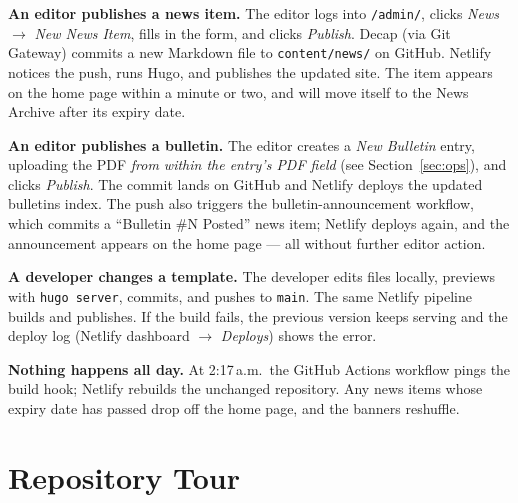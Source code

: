 \documentclass[12pt,letterpaper]{article}
\begin{document}
\textbf{An editor publishes a news item.} The editor logs into
\texttt{/admin/}, clicks \emph{News} $\rightarrow$ \emph{New News Item},
fills in the form, and clicks \emph{Publish}. Decap (via Git Gateway)
commits a new Markdown file to \texttt{content/news/} on GitHub. Netlify
notices the push, runs Hugo, and publishes the updated site. The item
appears on the home page within a minute or two, and will move itself to
the News Archive after its expiry date.

\textbf{An editor publishes a bulletin.} The editor creates a \emph{New
Bulletin} entry, uploading the PDF \emph{from within the entry's PDF field}
(see Section~\ref{sec:ops}), and clicks \emph{Publish}. The commit lands on
GitHub and Netlify deploys the updated bulletins index. The push also
triggers the bulletin-announcement workflow, which commits a ``Bulletin
\#N Posted'' news item; Netlify deploys again, and the announcement appears
on the home page --- all without further editor action.

\textbf{A developer changes a template.} The developer edits files locally,
previews with \texttt{hugo server}, commits, and pushes to \texttt{main}.
The same Netlify pipeline builds and publishes. If the build fails, the
previous version keeps serving and the deploy log (Netlify dashboard
$\rightarrow$ \emph{Deploys}) shows the error.

\textbf{Nothing happens all day.} At 2:17\,a.m.\ the GitHub Actions
workflow pings the build hook; Netlify rebuilds the unchanged repository.
Any news items whose expiry date has passed drop off the home page, and the
banners reshuffle.

\section{Repository Tour}
\label{sec:repo}
\end{document}
